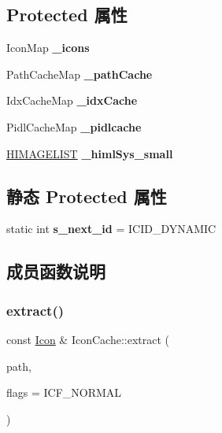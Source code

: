 \subsection*{Protected 属性}
\begin{DoxyCompactItemize}
\item 
\mbox{\label{struct_icon_cache_ad73e6367cab4ad377a4db65f9e7df6f1}} 
Icon\+Map {\bfseries \+\_\+icons}
\item 
\mbox{\label{struct_icon_cache_a4a8198a5dea92dd8a12e405c578ef143}} 
Path\+Cache\+Map {\bfseries \+\_\+path\+Cache}
\item 
\mbox{\label{struct_icon_cache_a6b161cc0ec7ffddf3624f391d05e8b06}} 
Idx\+Cache\+Map {\bfseries \+\_\+idx\+Cache}
\item 
\mbox{\label{struct_icon_cache_a9cebf62cc5743f141d2e36ad9cce34f0}} 
Pidl\+Cache\+Map {\bfseries \+\_\+pidlcache}
\item 
\mbox{\label{struct_icon_cache_ae0c618168e481b7aa7333f4fdc56cf37}} 
\hyperlink{struct___i_m_a_g_e_l_i_s_t}{H\+I\+M\+A\+G\+E\+L\+I\+ST} {\bfseries \+\_\+himl\+Sys\+\_\+small}
\end{DoxyCompactItemize}
\subsection*{静态 Protected 属性}
\begin{DoxyCompactItemize}
\item 
\mbox{\label{struct_icon_cache_a1e39040137152a498b82c3bf2233efce}} 
static int {\bfseries s\+\_\+next\+\_\+id} = I\+C\+I\+D\+\_\+\+D\+Y\+N\+A\+M\+IC
\end{DoxyCompactItemize}


\subsection{成员函数说明}
\mbox{\label{struct_icon_cache_aa765b3e3ca0eea6f221fa25ad6c11c7c}} 
\subsubsection{\texorpdfstring{extract()}{extract()}\hspace{0.1cm}{\footnotesize\ttfamily [1/3]}}
{\footnotesize\ttfamily const \hyperlink{struct_icon}{Icon} \& Icon\+Cache\+::extract (\begin{DoxyParamCaption}\item[{L\+P\+C\+T\+S\+TR}]{path,  }\item[{I\+C\+O\+N\+C\+A\+C\+H\+E\+\_\+\+F\+L\+A\+GS}]{flags = {\ttfamily ICF\+\_\+NORMAL} }\end{DoxyParamCaption})}

